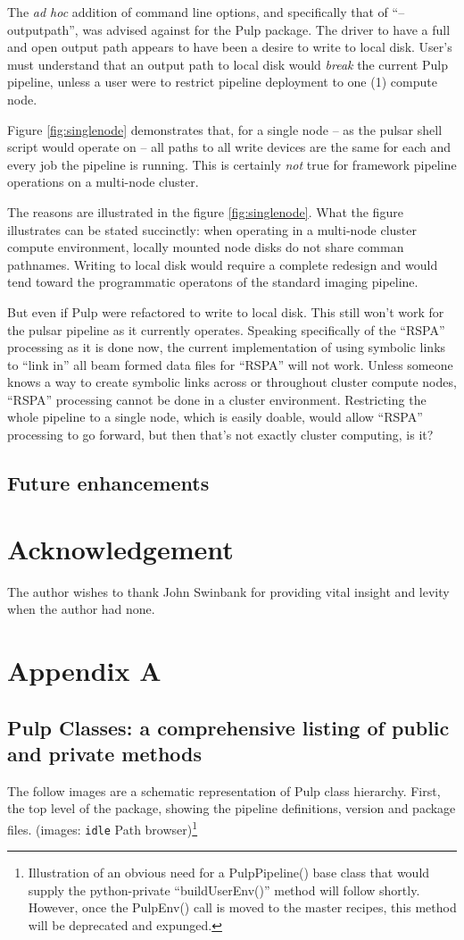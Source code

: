 \documentclass[a4paper,10pt,bibtotoc]{scrartcl}
\begin{document}
The \emph{ad hoc} addition of command line options, and
specifically that of  ``--outputpath'',  was advised against for
the Pulp package.  The driver to have a full and open output path appears
to have been a desire to write to local disk.  User's must understand
that an output path to local disk would \emph{break} the current Pulp
pipeline, unless a user were to restrict pipeline deployment to one
(1) compute node.


Figure \ref{fig:singlenode}  demonstrates that, for a single node --
as the pulsar shell script  would operate on -- all paths to all write
devices are the same for each and every job the pipeline is
running. This is certainly \emph{not} true for framework pipeline
  operations on a multi-node cluster.

The reasons are illustrated in the figure \ref{fig:singlenode}.  What
the figure illustrates can be stated succinctly: when operating in a
multi-node cluster compute environment, locally mounted node disks do
not share comman pathnames.  Writing to local disk would require a
complete redesign and would tend toward the programmatic operatons of
the standard imaging pipeline.

But even if Pulp were refactored to write to local disk.  This still
won't work for the pulsar pipeline as it currently operates.  Speaking
specifically of the ``RSPA'' processing as it is done now, the current
implementation of using symbolic links to ``link in'' all beam formed
data files for ``RSPA'' will not work.  Unless someone knows a way to
create symbolic links across or throughout cluster compute nodes,
``RSPA'' processing cannot be done in a cluster environment.
Restricting the whole pipeline to a single node, which is easily
doable, would allow ``RSPA'' processing to go forward, but then that's
not exactly cluster computing, is it?

\subsection{Future enhancements}
\section{Acknowledgement}
The author wishes to thank John Swinbank for providing vital insight
and levity when the author had none.
\newpage
\section{Appendix A}
\subsection{Pulp Classes: a comprehensive listing of public and private methods}
\label{sec:future-enhancements}
The follow images are a schematic representation of Pulp class
hierarchy.  First, the top level of the package, showing the pipeline
definitions, version and package files. (images: \verb|idle| Path
browser)\footnote{Illustration of an obvious need for a PulpPipeline()
 base class that would supply the python-private ``buildUserEnv()''
 method will follow shortly. However, once the PulpEnv() call is moved to
 the master recipes, this method will be deprecated and expunged.}
\end{document}

